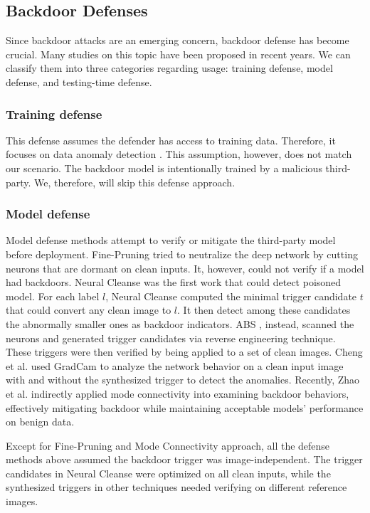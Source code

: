 \documentclass{article}
\begin{document}
\subsection{Backdoor Defenses}
Since backdoor attacks are an emerging concern, backdoor defense has become crucial. Many studies on this topic have been proposed in recent years. We can classify them into three categories regarding usage: training defense, model defense, and testing-time defense.

\subsubsection{Training defense} This defense assumes the defender has access to training data. Therefore, it focuses on data anomaly detection \cite{tran2018spectral}. This assumption, however, does not match our scenario. The backdoor model is intentionally trained by a malicious third-party. We, therefore, will skip this defense approach.

\subsubsection{Model defense} Model defense methods attempt to verify or mitigate the third-party model before deployment. 
Fine-Pruning \cite{liu2018fine} tried to neutralize the deep network by cutting neurons that are dormant on clean inputs. It, however, could not verify if a model had backdoors. 
Neural Cleanse \cite{wang2019neural} was the first work that could detect poisoned model. For each label $l$, Neural Cleanse computed the minimal trigger candidate $t$ that could convert any clean image to $l$. It then detect among these candidates the abnormally smaller ones as backdoor indicators. ABS \cite{liu2019abs}, instead, scanned the neurons and generated trigger candidates via reverse engineering technique. These triggers were then verified by being applied to a set of clean images. Cheng et al. \cite{Cheng2019} used GradCam \cite{selvaraju2017grad} to analyze the network behavior on a clean input image with and without the synthesized trigger to detect the anomalies. Recently, Zhao et al. \cite{zhao2020bridging} indirectly applied mode connectivity into examining backdoor behaviors, effectively mitigating backdoor while maintaining acceptable models' performance on benign data.

Except for Fine-Pruning and Mode Connectivity approach, all the defense methods above assumed the backdoor trigger was image-independent. The trigger candidates in Neural Cleanse were optimized on all clean inputs, while the synthesized triggers in other techniques needed verifying on different reference images.
\end{document}
